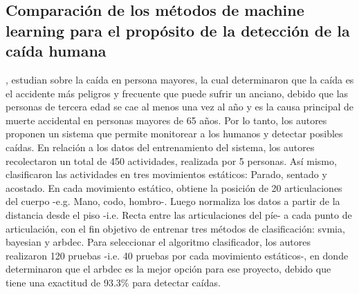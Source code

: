 \subsection{Comparaci\'on de los m\'etodos de machine learning para el prop\'osito de la detecci\'on de la ca\'ida humana} \label{tr:4}
, estudian sobre la  ca\'ida en persona mayores, la cual determinaron que la ca\'ida  es el accidente m\'as peligros y frecuente que puede sufrir un anciano, debido que las personas de tercera edad se cae al menos una vez al a\~no y es la causa principal de muerte accidental en personas mayores de 65 a\~nos. Por lo tanto, los autores proponen un sistema que permite monitorear a los humanos y detectar posibles ca\'idas.
\medbreak
En relaci\'on a los datos del entrenamiento del sistema, los autores recolectaron un total de 450 actividades, realizada por 5 personas. As\'i mismo, clasificaron las actividades en tres movimientos est\'aticos: Parado, sentado y acostado. En cada movimiento est\'atico, obtiene la posici\'on de 20 articulaciones del cuerpo -e.g. Mano, codo, hombro-. Luego normaliza los datos a partir de la distancia desde el piso -i.e. Recta entre las articulaciones del p\'ie- a cada punto de articulaci\'on, con el fin objetivo de entrenar tres m\'etodos de clasificaci\'on: \gls{svmia}, \gls{bayesian} y \gls{arbdec}.
\medbreak
Para seleccionar el algoritmo clasificador, los autores realizaron 120 pruebas -i.e. 40 pruebas por cada movimiento est\'aticos-, en donde determinaron  que el \gls{arbdec} es la mejor opci\'on para ese proyecto, debido que tiene una exactitud de 93.3\% para detectar ca\'idas.
